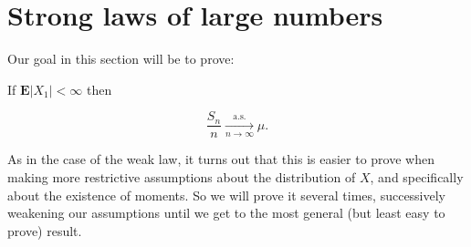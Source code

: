 \section{Strong laws of large numbers}

Our goal in this section will be to prove:

\begin{thm}
\label{thm-slln}
If $\mathbf{E}|X_1|<\infty$ then

\[
\frac{S_n}{n} \xrightarrow[n\to\infty]{\textrm{a.s.}} \mu.
\]

\end{thm}

\noindent As in the case of the weak law, it turns out that
this is easier to prove when making more restrictive
assumptions about the distribution of $X$, and
specifically about the existence of moments. So we
will prove it several times, successively weakening
our assumptions until we get to the most general (but
least easy to prove) result.

